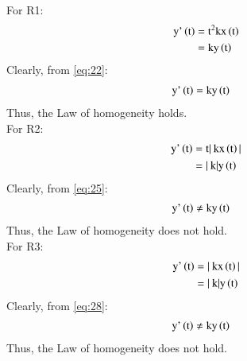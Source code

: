 \documentclass[journal,12pt,twocolumn]{IEEEtran}
\begin{document}
For R1:
\begin{align}
\label{eq:21}
 \text{y'}\left(\text{t}\right) ={}& \text{t}^2\text{k}\text{x}\left(\text{t}\right)\\
 \label{eq:22}
   ={}& \text{k}\text{y}\left(\text{t}\right)
\end{align}
Clearly, from \eqref{eq:22}:
\begin{align}
\label{eq:23}
    \text{y'}\left(\text{t}\right) ={}& \text{k}\text{y}\left(\text{t}\right)
\end{align}
Thus, the Law of homogeneity holds.\\

For R2:
\begin{align}
\label{eq:24}
 \text{y'}\left(\text{t}\right) ={}& \text{t}|\:\text{k}\text{x}\left(\text{t}\right)|\\
 \label{eq:25}
   ={}& |\:\text{k}|\text{y}\left(\text{t}\right)
\end{align}
Clearly, from \eqref{eq:25}:
\begin{align}
\label{eq:26}
    \text{y'}\left(\text{t}\right) \neq{}& \text{k}\text{y}\left(\text{t}\right)
\end{align}
Thus, the Law of homogeneity does not hold.\\

For R3:
\begin{align}
\label{eq:27}
 \text{y'}\left(\text{t}\right) ={}& |\:\text{k}\text{x}\left(\text{t}\right)|\\
 \label{eq:28}
   ={}& |\:\text{k}|\text{y}\left(\text{t}\right)
\end{align}
Clearly, from \eqref{eq:28}:
\begin{align}
\label{eq:29}
    \text{y'}\left(\text{t}\right) \neq{}& \text{k}\text{y}\left(\text{t}\right)
\end{align}
Thus, the Law of homogeneity does not hold.\\
\end{document}
